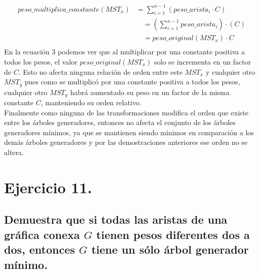\documentclass[12pt]{article}
\begin{document}
\begin{equation}
\begin{split}
peso\_multiplica\_constante(MST_x) & = \sum_{i=1}^{n - 1} (peso\_arista_i \cdot C ) \\
&\quad = (\sum_{i=1}^{n - 1} peso\_arista_i) \cdot (C) \\  
&\quad = peso\_original(MST_x) \cdot C\\  
\end{split}
\end{equation}
En la ecuación 3 podemos ver que al multiplicar por una constante positiva a todos los pesos, el valor $peso\_original(MST_x)$ solo se incrementa en un factor de $C$. Esto no afecta ninguna relación de orden entre este $MST_x$ y cualquier otro $MST_y$ pues como se multiplicó por una constante positiva a todos los pesos, cualquier otro $MST_y$ habrá aumentado su peso en un factor de la misma constante $C$, manteniendo su orden relativo.\\
Finalmente como ninguna de las transformaciones modifica el orden que existe entre los árboles generadores, entonces no afecta el conjunto de los árboles generadores mínimos, ya que se mantienen siendo mínimos en comparación a los demás árboles generadores y por las demostraciones anteriores ese orden no se altera.\\
\section{Ejercicio 11.}
\subsection{Demuestra que si todas las aristas de una gráfica conexa $G$ tienen pesos diferentes dos a dos, entonces $G$ tiene un sólo árbol generador mínimo.}
\end{document}
